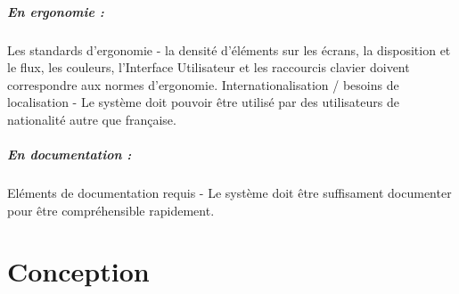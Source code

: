 \documentclass[12pt,a4paper,openany]{report}
\begin{document}
		\paragraph{En ergonomie :}
		Les standards d'ergonomie - la densité d'éléments sur les écrans, la disposition et le flux, les couleurs, l'Interface 
		Utilisateur et les raccourcis clavier doivent correspondre aux normes d'ergonomie.
		Internationalisation / besoins de localisation - Le système doit pouvoir être utilisé par des utilisateurs de nationalité autre que française.
		\paragraph{En documentation :}
		Eléments de documentation requis - Le système doit être suffisament documenter pour être compréhensible rapidement.
	\chapter{Conception}
\end{document}
